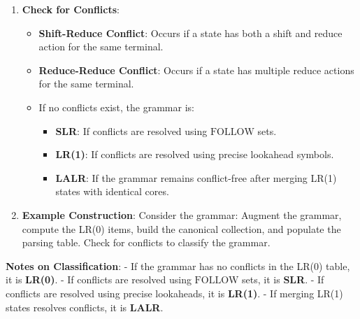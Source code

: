 \begin{enumerate}
  \item \textbf{Check for Conflicts}:
  \begin{itemize}
    \item \textbf{Shift-Reduce Conflict}: Occurs if a state has both a shift and reduce action for the same terminal.
    \item \textbf{Reduce-Reduce Conflict}: Occurs if a state has multiple reduce actions for the same terminal.
    \item If no conflicts exist, the grammar is:
    \begin{itemize}
      \item \textbf{SLR}: If conflicts are resolved using \(\text{FOLLOW}\) sets.
      \item \textbf{LR(1)}: If conflicts are resolved using precise lookahead symbols.
      \item \textbf{LALR}: If the grammar remains conflict-free after merging LR(1) states with identical cores.
    \end{itemize}
  \end{itemize}

  \item \textbf{Example Construction}:
  Consider the grammar:
  Augment the grammar, compute the LR(0) items, build the canonical collection, and populate the parsing table. Check for conflicts to classify the grammar.

\end{enumerate}

\textbf{Notes on Classification}:
- If the grammar has no conflicts in the LR(0) table, it is \textbf{LR(0)}.
- If conflicts are resolved using \(\text{FOLLOW}\) sets, it is \textbf{SLR}.
- If conflicts are resolved using precise lookaheads, it is \textbf{LR(1)}.
- If merging LR(1) states resolves conflicts, it is \textbf{LALR}.
